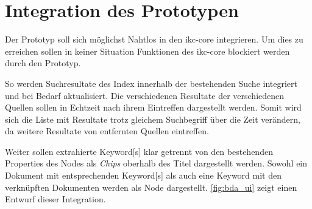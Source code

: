 
    



\section{Integration des Prototypen}

Der Prototyp soll sich möglichst Nahtlos in den \gls{ikc-core} integrieren. Um dies zu erreichen sollen in keiner Situation Funktionen des \gls{ikc-core} blockiert werden durch den Prototyp. 

So werden Suchresultate des Index innerhalb der bestehenden Suche integriert und bei Bedarf aktualisiert. Die verschiedenen Resultate der verschiedenen Quellen sollen in Echtzeit nach ihrem Eintreffen dargestellt werden. Somit wird sich die Liste mit Resultate trotz gleichem Suchbegriff über die Zeit verändern, da weitere Resultate von entfernten Quellen eintreffen. 

Weiter sollen extrahierte \gls{Keyword}[s] klar getrennt von den bestehenden Properties des Nodes als \textit{Chips} oberhalb des Titel dargestellt werden. Sowohl ein Dokument mit entsprechenden \gls{Keyword}[s] als auch eine \gls{Keyword} mit den verknüpften Dokumenten werden als Node dargestellt. \autoref{fig:bda_ui} zeigt einen Entwurf dieser Integration. 


